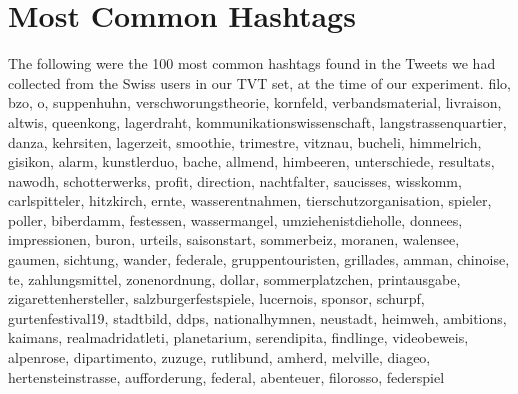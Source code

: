 \documentclass[10pt,a4paper]{article}
\begin{document}
\section{Most Common Hashtags}
\label{sec:appendix-hashtags}
The following were the 100 most common hashtags found in the Tweets we had collected from the Swiss users in our TVT set, at the time of our experiment.
\bigbreak
\noindent filo, bzo, o, suppenhuhn, verschworungstheorie, kornfeld, verbandsmaterial, livraison, altwis, queenkong, lagerdraht, kommunikationswissenschaft, langstrassenquartier, danza, kehrsiten, lagerzeit, smoothie, trimestre, vitznau, bucheli, himmelrich, gisikon, alarm, kunstlerduo, bache, allmend, himbeeren, unterschiede, resultats, nawodh, schotterwerks, profit, direction, nachtfalter, saucisses, wisskomm, carlspitteler, hitzkirch, ernte, wasserentnahmen, tierschutzorganisation, spieler, poller, biberdamm, festessen, wassermangel, umziehenistdieholle, donnees, impressionen, buron, urteils, saisonstart, sommerbeiz, moranen, walensee, gaumen, sichtung, wander, federale, gruppentouristen, grillades, amman, chinoise, te, zahlungsmittel, zonenordnung, dollar, sommerplatzchen, printausgabe, zigarettenhersteller, salzburgerfestspiele, lucernois, sponsor, schurpf, gurtenfestival19, stadtbild, ddps, nationalhymnen, neustadt, heimweh, ambitions, kaimans, realmadridatleti, planetarium, serendipita, findlinge, videobeweis, alpenrose, dipartimento, zuzuge, rutlibund, amherd, melville, diageo, hertensteinstrasse, aufforderung, federal, abenteuer, filorosso, federspiel

\clearpage

\end{document}
